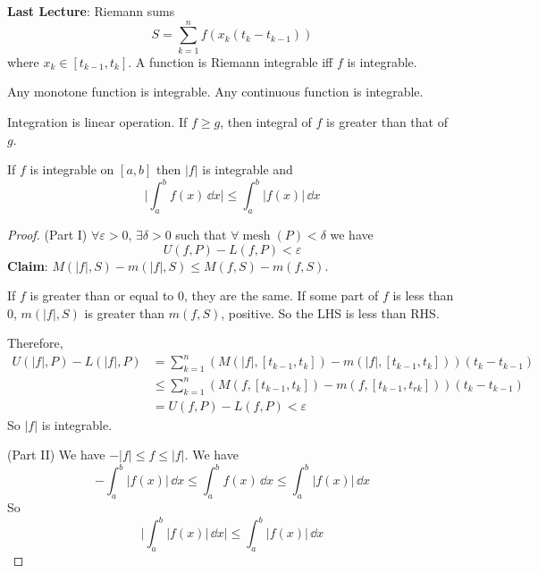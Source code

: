\documentclass{report}
\begin{document}
\textbf{Last Lecture}: Riemann sums
    \begin{equation*}
        S = \sum_{ k = 1}^{n}f(x_{k}(t_{k} - t_{k - 1}))
    \end{equation*} 
where $x_{k} \in [ t_{k - 1}, t_{k}]$. A function is Riemann integrable iff $f$ is integrable.

Any monotone function is integrable. Any continuous function is integrable. 

Integration is linear operation. If $f \geq g$, then integral of $f$ is greater than that of $g$.

\begin{theorem}{33.5}
    If $f$ is integrable on $[a, b]$ then $\lvert f \rvert$ is integrable and
        \begin{equation*}
            \lvert \int_{a}^{b} f(x) \, \dd{x}  \rvert   \leq  \int_{ a}^{b} \lvert f(x) \rvert  \, \dd{x} 
        \end{equation*}
\end{theorem}
    \begin{proof}
        (Part I) $\forall \varepsilon>  0$, $\exists \delta>  0$ such that $\forall \mathop{mesh}(P) < \delta$ we have
            \begin{equation*}
                U(f, P) - L(f, P) < \varepsilon
            \end{equation*}
        \textbf{Claim}: $M(\lvert f \rvert, S) - m(\lvert f \rvert, S) \leq M( f, S) - m(f, S)$. 

        If $f$ is greater than or equal to $0$, they are the same. If some part of $f$ is less than $0$, $m(\lvert f \rvert, S)$ is greater than $m(f, S)$, positive. So the LHS is less than RHS. 

        Therefore, 
            \begin{align*}
                U(\lvert f \rvert, P) - L(\lvert f \rvert, P) &= \sum_{ k = 1}^{n}(M(\lvert f \rvert, [ t_{k - 1}, t_{k}]) - m(\lvert f \rvert, [ t_{k - 1}, t_{k}]))(t_{k} - t_{k - 1}) \\
                                                            &\leq \sum_{ k = 1}^{n}(M(f, [t_{k - 1}, t_{k}]) - m(f, [t_{k - 1}, t_{rk}]))(t_{k} - t_{k - 1}) \\
                                                            &= U(f, P) - L(f, P) < \varepsilon
            \end{align*} 
        So $ \lvert f \rvert$ is integrable.

        (Part II) We have $-\lvert f \rvert \leq  f \leq  \lvert  f \rvert$. We have
            \begin{equation*}
                -\int_{a}^{b}  \lvert f(x) \rvert  \, \dd{x}  \leq \int_{ a}^{b} f(x) \, \dd{x}  \leq \int_{ a}^{b} \lvert f(x) \rvert \, \dd{ x} 
            \end{equation*}
        So
            \begin{equation*}
                \lvert \int_{a}^{b} \lvert f(x) \rvert \, \dd{ x}  \rvert \leq  \int_{ a}^{b} \lvert f(x) \rvert \, \dd{ x} 
            \end{equation*}
    \end{proof}
\end{document}
